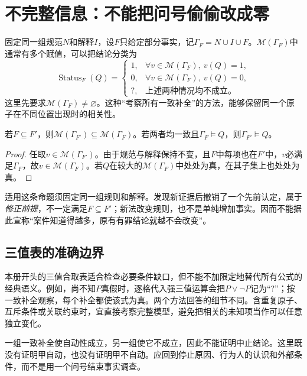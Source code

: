 \section{不完整信息：不能把问号偷偷改成零}
固定同一组规范$N$和解释$I$，设$F$只给定部分事实，记$\Gamma_F=N\cup I\cup F$。$\mathcal M(\Gamma_F)$中通常有多个赋值，可以把结论分类为
\[
 \operatorname{Status}_F(Q)=
 \begin{cases}
  1,&\forall v\in\mathcal M(\Gamma_F),\ v(Q)=1,\\
  0,&\forall v\in\mathcal M(\Gamma_F),\ v(Q)=0,\\
  ?,&\text{上述两种情况均不成立。}
 \end{cases}
\]
这里先要求$\mathcal M(\Gamma_F)\ne\varnothing$。这种“考察所有一致补全”的方法，能够保留同一个原子在不同位置出现时的相关性。

\begin{modelprop}[补充一致事实只会缩小模型集合]
若$F\subseteq F'$，则$\mathcal M(\Gamma_{F'})\subseteq\mathcal M(\Gamma_F)$。若两者均一致且$\Gamma_F\models Q$，则$\Gamma_{F'}\models Q$。
\end{modelprop}
\begin{proof}
任取$v\in\mathcal M(\Gamma_{F'})$。由于规范与解释保持不变，且$F$中每项也在$F'$中，$v$必满足$\Gamma_F$，故$v\in\mathcal M(\Gamma_F)$。若$Q$在较大的$\mathcal M(\Gamma_F)$中处处为真，在其子集上也处处为真。
\end{proof}

适用这条命题须固定同一组规则和解释。发现新证据后撤销了一个先前认定，属于\emph{修正前提}，不一定满足$F\subseteq F'$；新法改变规则，也不是单纯增加事实。因而不能据此宣称“案件知道得越多，原有有罪结论就越不会改变”。

\subsection{三值表的准确边界}
本册开头的三值合取表适合检查必要条件缺口，但不能不加限定地替代所有公式的经典语义。例如，尚不知$P$真假时，逐格代入强三值运算会把$P\vee\neg P$记为“?”；按一致补全观察，每个补全都使该式为真。两个方法回答的细节不同。含重复原子、互斥条件或关联约束时，宜直接考察完整模型，避免把相关的未知项当作可以任意独立变化。

一组一致补全使自动性成立，另一组使它不成立，因此不能证明中止结论。这里既没有证明甲自动，也没有证明甲不自动。应回到停止原因、行为人的认识和外部条件，而不是用一个问号结束事实调查。


